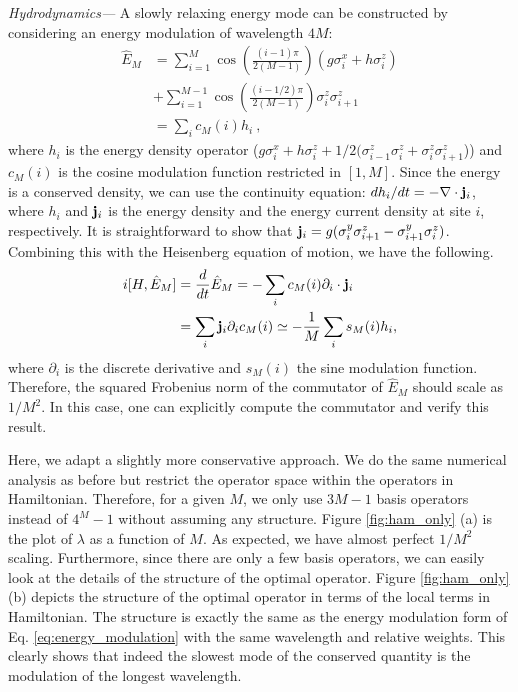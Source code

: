 \documentclass[twocolumn,superscriptaddress, prb]{revtex4-1}
\begin{document}
{\it Hydrodynamics---}
A slowly relaxing energy mode can be constructed by considering an energy modulation of wavelength $4M$:
\begin{align}
\hat{E}_M &= \sum_{i=1}^{M} \cos\left(\frac{(i-1)\pi}{2(M-1)}\right)(g \sigma^x_i + h\sigma^z_i)\nonumber\\
&+ \sum_{i=1}^{M-1} \cos\left(\frac{(i-1/2)\pi}{2(M-1)}\right)\sigma^z_i\sigma^z_{i+1}\\
&= \sum_i c_M(i) h_i ~,
\label{eq:energy_modulation}
\end{align}
where $h_i$ is the energy density operator ($g \sigma^x_i + h\sigma^z_i + 1/2(\sigma^z_{i-1}\sigma^z_i + \sigma^z_i\sigma^z_{i+1}$))
and $c_M(i)$ is the cosine modulation function restricted in $[1,M]$.
Since the energy is a conserved density, we can use the continuity equation:
$d h_i/dt = -\nabla \cdot {\bf j}_i$, where $h_i$ and ${\bf j}_i$ is the energy density and the energy current density at site $i$, respectively.
It is straightforward to show that ${\bf j}_i = g(\sigma^y_i \sigma^z_{i+1} - \sigma^y_{i+1} \sigma^z_i)$.
Combining this with the Heisenberg equation of motion, we have the following.
\begin{align}
 i[H,\hat{E}_M] &= \frac{d}{dt} \hat{E}_M = -\sum_i c_M(i) \partial_i \cdot {\bf j}_i \\
 &= \sum_i {\bf j}_i \partial_i c_M(i) \simeq -\frac{1}{M} \sum_i s_M(i) h_i,
\end{align}
where $\partial_i$ is the discrete derivative and $s_M(i)$ the sine modulation function.
Therefore, the squared Frobenius norm of the commutator of $\hat{E}_M$ should scale as $1/M^2$.  In this case, one can explicitly compute the commutator and verify this result.

Here, we adapt a slightly more conservative approach.
We do the same numerical analysis as before but restrict the operator space within the operators in Hamiltonian.
Therefore, for a given $M$, we only use $3M - 1$ basis operators instead of $4^M-1$ without assuming any structure.
Figure \ref{fig:ham_only} (a) is the plot of $\lambda$ as a function of $M$.
As expected, we have almost perfect $1/M^2$ scaling.
Furthermore, since there are only a few basis operators, we can easily look at the details of the structure of the optimal operator.
Figure \ref{fig:ham_only} (b) depicts the structure of the optimal operator in terms of the local terms in Hamiltonian.
The structure is exactly the same as the energy modulation form of Eq. \eqref{eq:energy_modulation} with the same wavelength and relative weights.
This clearly shows that indeed the slowest mode of the conserved quantity is the modulation of the longest wavelength.
\end{document}
